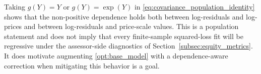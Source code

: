 \documentclass{article}
\theoremstyle{plain}
\theoremstyle{definition}
\newcommand{\E}{\mathbb{E}}
\newcommand{\1}{\mathbf{1}}
\newcommand{\Cov}{\text{Cov}}
\newcommand{\Var}{\text{Var}}
\begin{document}

Taking $g(Y)=Y$ or $g(Y)=\exp(Y)$ in \eqref{eq:covariance_population_identity} shows that the non-positive dependence holds both between log-residuals and log-prices and between log-residuals and price-scale values. This is a population statement and does not imply that every finite-sample squared-loss fit will be regressive under the assessor-side diagnostics of Section~\ref{subsec:equity_metrics}. It does motivate augmenting \eqref{opt:base_model} with a dependence-aware correction when mitigating this behavior is a goal.




\end{document}
